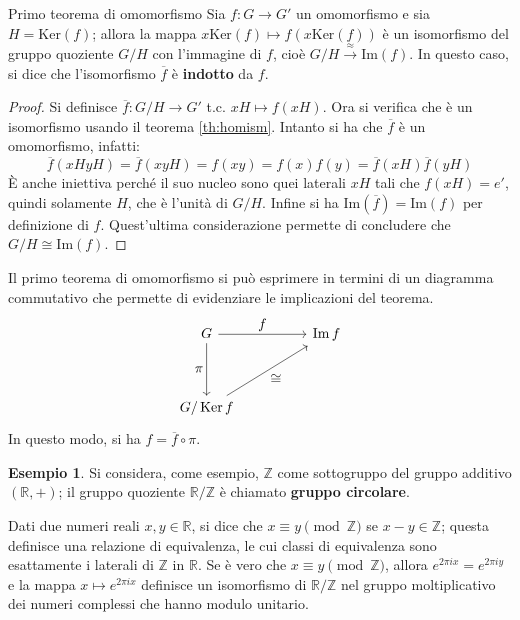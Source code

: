 \documentclass[11pt, a4paper]{scrartcl}
\theoremstyle{definition}
\newtheorem{esempio}{Esempio}
\numberwithin{esempio}{section}
\theoremstyle{definition}
\numberwithin{obs}{section}
\numberwithin{nota}{section}
\numberwithin{equation}{subsection}
\begin{document}
\begin{teorema}
	{Primo teorema di omomorfismo}{}
	Sia $f:G\to G'$ un omomorfismo e sia $H= \mathrm{Ker} (f)$; allora la mappa $x \mathrm{Ker} (f) \mapsto f(x \mathrm{Ker} (f))$ \`e un isomorfismo del gruppo quoziente $G / H$ con l'immagine di $f$, cio\`e $G/H \stackrel{\approx}{\longrightarrow}\mathrm{Im} (f)$.
In questo caso, si dice che l'isomorfismo $\overline{f}$ \`e \textbf{indotto} da $f$.
	\begin{proof}
		Si definisce $\overline{f}: G / H \to G' $ t.c. $ xH \mapsto f(xH)$. Ora si verifica che \`e un isomorfismo usando il teorema \ref{th:homism}. Intanto si ha che $\overline{f}$ \`e un omomorfismo, infatti:
		\[
		\overline{f}(xHyH) = \overline{f}(xyH) = f(xy) = f(x)f(y) = \overline{f}(xH) \overline{f}(yH)
		\] 
\`E anche iniettiva perch\'e il suo nucleo sono quei laterali $xH$ tali che $f(xH) = e'$, quindi solamente $H$, che \`e l'unit\`a di $G / H$.
Infine si ha $\mathrm{Im} (\overline{f}) = \mathrm{Im} (f)$ per definizione di $f$.
Quest'ultima considerazione permette di concludere che $G / H \cong \mathrm{Im} (f)$.
	\end{proof}
\end{teorema}
\noindent Il primo teorema di omomorfismo si pu\`o esprimere in termini di un diagramma commutativo che permette di evidenziare le implicazioni del teorema.
\[\begin{tikzcd}
	G && {\operatorname{Im}f} \\
	\\
	{G/\operatorname{Ker} f}
	\arrow["\displaystyle f", from=1-1, to=1-3]
	\arrow["\displaystyle \pi"', from=1-1, to=3-1]
	\arrow["\displaystyle \cong"', from=3-1, to=1-3]
\end{tikzcd}\]
In questo modo, si ha $f = \overline{f}\circ \pi$.
\begin{esempio}
Si considera, come esempio, $\mathbb{Z}$ come sottogruppo del gruppo additivo $(\mathbb{R}, + )$; il gruppo quoziente $\mathbb{R} / \mathbb{Z}$ \`e chiamato \textbf{gruppo circolare}. 

Dati due numeri reali $x,y \in \mathbb{R}$, si dice che $x \equiv y \pmod{\mathbb{Z}}$ se $x - y \in \mathbb{Z}$; questa definisce una relazione di equivalenza, le cui classi di equivalenza sono esattamente i laterali di $\mathbb{Z}$ in $\mathbb{R}$. 
Se \`e vero che $x \equiv y \pmod{\mathbb{Z}}$, allora $e^{2\pi i x} = e^{2\pi i y} $ e la mappa $x \mapsto e^{2\pi i x} $ definisce un isomorfismo di $\mathbb{R} / \mathbb{Z}$ nel gruppo moltiplicativo dei numeri complessi che hanno modulo unitario.
\end{esempio}
\end{document}
